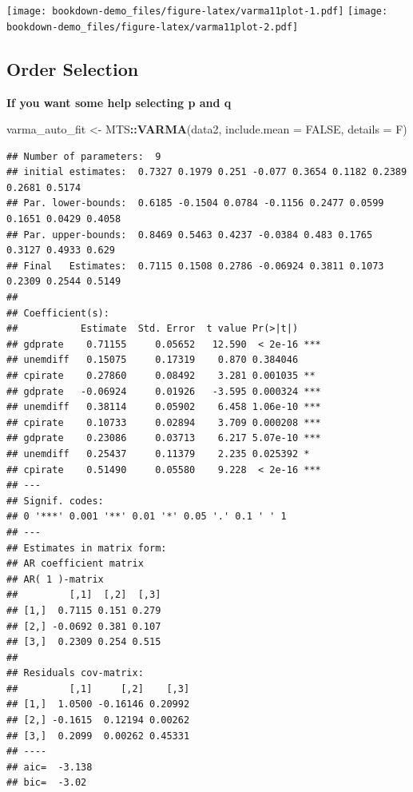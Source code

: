 \documentclass[]{book}
\newenvironment{Shaded}{\begin{snugshade}}{\end{snugshade}}
\newcommand{\DataTypeTok}[1]{\textcolor[rgb]{0.13,0.29,0.53}{#1}}
\newcommand{\KeywordTok}[1]{\textcolor[rgb]{0.13,0.29,0.53}{\textbf{#1}}}
\newcommand{\NormalTok}[1]{#1}
\newcommand{\OperatorTok}[1]{\textcolor[rgb]{0.81,0.36,0.00}{\textbf{#1}}}
\newcommand{\OtherTok}[1]{\textcolor[rgb]{0.56,0.35,0.01}{#1}}
\newcommand{\StringTok}[1]{\textcolor[rgb]{0.31,0.60,0.02}{#1}}
\begin{document}
\texttt{[image: bookdown-demo\_files/figure-latex/varma11plot-1.pdf]} \texttt{[image: bookdown-demo\_files/figure-latex/varma11plot-2.pdf]}

\newpage

\hypertarget{order-selection}{%
\subsection{Order Selection}\label{order-selection}}

\textbf{If you want some help selecting p and q}

\begin{Shaded}
\begin{Highlighting}[]
\NormalTok{varma_auto_fit <-}\StringTok{ }\NormalTok{MTS}\OperatorTok{::}\KeywordTok{VARMA}\NormalTok{(data2, }\DataTypeTok{include.mean =} \OtherTok{FALSE}\NormalTok{, }\DataTypeTok{details =}\NormalTok{ F)}
\end{Highlighting}
\end{Shaded}

\begin{verbatim}
## Number of parameters:  9 
## initial estimates:  0.7327 0.1979 0.251 -0.077 0.3654 0.1182 0.2389 0.2681 0.5174 
## Par. lower-bounds:  0.6185 -0.1504 0.0784 -0.1156 0.2477 0.0599 0.1651 0.0429 0.4058 
## Par. upper-bounds:  0.8469 0.5463 0.4237 -0.0384 0.483 0.1765 0.3127 0.4933 0.629 
## Final   Estimates:  0.7115 0.1508 0.2786 -0.06924 0.3811 0.1073 0.2309 0.2544 0.5149 
## 
## Coefficient(s):
##           Estimate  Std. Error  t value Pr(>|t|)    
## gdprate    0.71155     0.05652   12.590  < 2e-16 ***
## unemdiff   0.15075     0.17319    0.870 0.384046    
## cpirate    0.27860     0.08492    3.281 0.001035 ** 
## gdprate   -0.06924     0.01926   -3.595 0.000324 ***
## unemdiff   0.38114     0.05902    6.458 1.06e-10 ***
## cpirate    0.10733     0.02894    3.709 0.000208 ***
## gdprate    0.23086     0.03713    6.217 5.07e-10 ***
## unemdiff   0.25437     0.11379    2.235 0.025392 *  
## cpirate    0.51490     0.05580    9.228  < 2e-16 ***
## ---
## Signif. codes:  
## 0 '***' 0.001 '**' 0.01 '*' 0.05 '.' 0.1 ' ' 1
## --- 
## Estimates in matrix form: 
## AR coefficient matrix 
## AR( 1 )-matrix 
##         [,1]  [,2]  [,3]
## [1,]  0.7115 0.151 0.279
## [2,] -0.0692 0.381 0.107
## [3,]  0.2309 0.254 0.515
##   
## Residuals cov-matrix: 
##         [,1]     [,2]    [,3]
## [1,]  1.0500 -0.16146 0.20992
## [2,] -0.1615  0.12194 0.00262
## [3,]  0.2099  0.00262 0.45331
## ---- 
## aic=  -3.138 
## bic=  -3.02
\end{verbatim}
\end{document}
